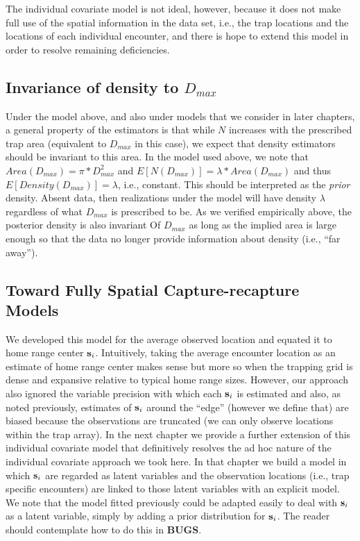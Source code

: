 The individual
covariate model is not ideal, however, because it does not make full
use of the spatial information in the data set, i.e., the trap
locations and the locations of each individual encounter, and there is hope
to extend this model in order to resolve remaining deficiencies.


\subsection{Invariance of density to $D_{max}$}

Under the model above, and also under models that we consider in later
chapters, a general property of the estimators is that while $N$
increases with the prescribed trap area (equivalent to $D_{max}$ in this
case), we expect that density estimators should be invariant to this
area. In the model used above, we note that $Area(D_{max}) = 
\pi*D_{max}^{2}$ and $E[N(D_{max})] = \lambda*Area(D_{max})$ and thus
$E[Density(D_{max})] = \lambda$, i.e., constant. This should be 
interpreted as the {\it prior} density. Absent data, then realizations
under the model will have density $\lambda$ regardless of what $D_{max}$
is prescribed to be.  As we verified empirically above, the posterior
density is also invariant Of $D_{max}$ as long as the implied area
is large enough so that the data no longer provide
information about density (i.e., ``far away'').

\subsection{Toward Fully Spatial Capture-recapture Models}

We developed this model for the average observed location and equated
it to home range center ${\bf s}_{i}$. Intuitively, taking the average
encounter location as an estimate of home range center makes sense but
more so when the trapping grid is dense and expansive relative to
typical home range sizes.  However, our approach also ignored the
variable precision with which each ${\bf s}_{i}$ is estimated and also, as
noted previously, estimates of ${\bf s}_{i}$ around the ``edge'' (however we
define that) are biased because the observations are truncated (we can
only observe locations within the trap array).  In the next chapter we
provide a further extension of this individual covariate model that
definitively resolves the ad hoc nature of the individual covariate
approach we took here. In that chapter we build a model in which ${\bf s}_{i}$
are regarded as latent variables and the observation locations (i.e.,
trap specific encounters) are linked to those latent variables with an
explicit model. We note that the model fitted previously could be
adapted easily to deal with ${\bf s}_{i}$ as a latent variable, simply by
adding a prior distribution for ${\bf s}_{i}$. The reader should contemplate
how to do this in {\bf BUGS}.


